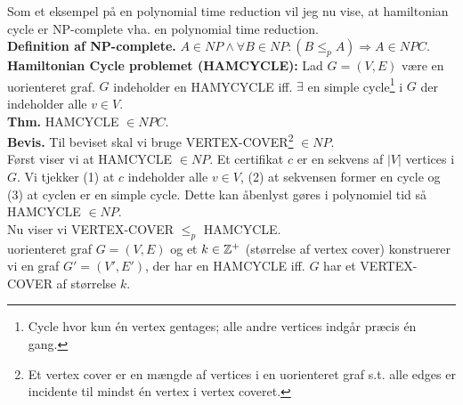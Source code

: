 Som et eksempel på en polynomial time reduction vil jeg nu vise, at hamiltonian cycle er NP-complete vha. en polynomial time reduction. \\

\textbf{Definition af NP-complete.} $A \in NP \wedge \forall B \in NP: (B \le_p A) \Longrightarrow A \in NPC$. \\

\textbf{Hamiltonian Cycle problemet (HAMCYCLE):} Lad $G=(V,E)$ være en uorienteret graf. $G$ indeholder en HAMYCYCLE iff. $\exists$ en simple cycle\footnote{Cycle hvor kun én vertex gentages; alle andre vertices indgår præcis én gang.} i $G$ der indeholder alle $v \in V$. \\

\textbf{Thm.} HAMCYCLE $\in NPC$. \\

\textbf{Bevis.} Til beviset skal vi bruge VERTEX-COVER\footnote{Et vertex cover er en mængde af vertices i en uorienteret graf s.t. alle edges er incidente til mindst én vertex i vertex coveret.} $\in NP$. \\

Først viser vi at HAMCYCLE $\in NP$. Et certifikat $c$ er en sekvens af $|V|$ vertices i $G$. Vi tjekker (1) at $c$ indeholder alle $v \in V$, (2) at sekvensen former en cycle og (3) at cyclen er en simple cycle. Dette kan åbenlyst gøres i polynomiel tid så HAMCYCLE $\in NP$. \\

Nu viser vi VERTEX-COVER $\le_p$ HAMCYCLE. \\

 uorienteret graf $G=(V,E)$ og et $k \in \mathbb{Z}^+$ (størrelse af vertex cover) konstruerer vi en graf $G'=(V',E')$, der har en HAMCYCLE iff. $G$ har et VERTEX-COVER af størrelse $k$. \\

